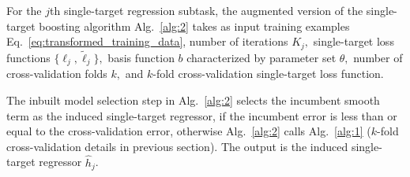 \documentclass[aps,twocolumn,superscriptaddress,floatfix,preprintnumbers,showkeys]{revtex4}
\begin{document}
For the $j$th single-target regression subtask, the augmented version of the single-target boosting algorithm Alg.~\ref{alg:2} takes as input training examples Eq.~\ref{eq:transformed_training_data}, number of iterations $K_{j},$ single-target loss functions $\{\ell_{j}, \tilde{\ell}_{j}\},$ basis function $b$ characterized by parameter set $\theta,$ number of cross-validation folds $k,$ and $k$-fold cross-validation single-target loss function. 
\begin{figure*}
\begin{minipage}{\linewidth}
\begin{algorithm}[H]
\SetAlgoLined
{}
\caption{$BaseBoostCV$}
\label{alg:2}
\end{algorithm}
\end{minipage}
\end{figure*}
The inbuilt model selection step in Alg.~\ref{alg:2} selects the incumbent smooth term as the induced single-target regressor, if the incumbent error is less than or equal to the cross-validation error, otherwise Alg.~\ref{alg:2} calls Alg.~\ref{alg:1} ($k$-fold cross-validation details in previous section). The output is the induced single-target regressor $\hat{h}_{j}$. 
\end{document}
